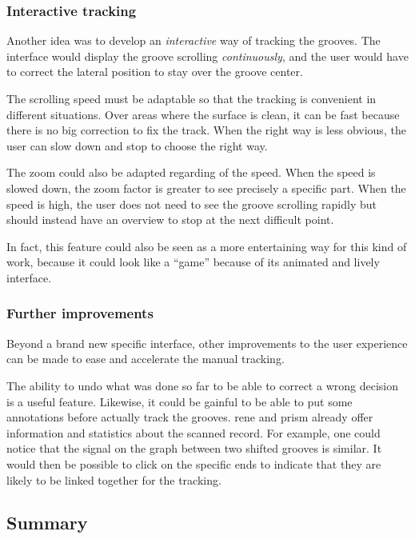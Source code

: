 \subsubsection{Interactive tracking}
\label{sec:inttrack}

Another idea was to develop an \emph{interactive} way of tracking the grooves. The interface would display the groove scrolling \emph{continuously}, and the user would have to correct the lateral position to stay over the groove center.

The scrolling speed must be adaptable so that the tracking is convenient in different situations. Over areas where the surface is clean, it can be fast because there is no big correction to fix the track. When the right way is less obvious, the user can slow down and stop to choose the right way.

The zoom could also be adapted regarding of the speed. When the speed is slowed down, the zoom factor is greater to see precisely a specific part. When the speed is high, the user does not need to see the groove scrolling rapidly but should instead have an overview to stop at the next difficult point.

In fact, this feature could also be seen as a more entertaining way for this kind of work, because it could look like a ``game'' because of its animated and lively interface.

\subsubsection{Further improvements}

Beyond a brand new specific interface, other improvements to the user experience can be made to ease and accelerate the manual tracking.

The ability to undo what was done so far to be able to correct a wrong decision is a useful feature. Likewise, it could be gainful to be able to put some annotations before actually track the grooves. \gls{rene} and \gls{prism} already offer information and statistics about the scanned record. For example, one could notice that the signal on the graph between two shifted grooves is similar. It would then be possible to click on the specific ends to indicate that they are likely to be linked together for the tracking.

\subsection{Summary}


